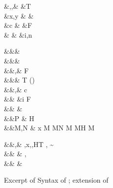 \documentclass[manuscript,screen,nonacm]{acmart}
\begin{document}
 \begin{figure}[ht]
 \begin{syntax}
  &\TyVar,\beta,\Co &\qquad{} &T \\
  &x,y &\qquad{} &\shl{\NType} \\
  &c &\qquad{} &F\\
                      &  &\qquad{} &i,n \in {}\\
 \end{syntax}
 \begin{syntax}
    &&\rho \bnfeq& \\
    &&\kappa \bnfeq& \star \bnfor \kappa \to \kappa \bnfor \shl{\sigma \sim^\kappa_\rho \tau}\\
    &&\tau,\sigma \bnfeq& \TyVar \bnfor {} \bnfor \tau\App\tau \bnfor \Forall {\TyVar\co\kappa} \tau \bnfor F\\
     &&\TypeConst \bnfeq& T \bnfor (\to) \bnfor \shl{\NType}\\
  &&\nu,\Co \bnfeq& c \bnfor {}\tau \bnfor \Sym\Co \bnfor \trans\nu\Co %
 \bnfor \Forall {\TyVar\co\kappa} \Co \bnfor \Co\At\tau %
 \bnfor \nu\App\Co \\
                  &&              &\bnfor \Left \Co \bnfor \Right \Co \bnfor \Nth i \Co \bnfor \TypeConst\App\many\Co \bnfor F\many\Co \bnfor \shl{\SubCo \Co} \\  %
  && \phi \bnfeq& \tau \bnfor \Co\\
  &&P \bnfeq& H\App \many{\TyVar\co\kappa} \\
  &&M,N \bnfeq& x \bnfor {} M \bnfor M\App N \bnfor \TLam{\tau\co\kappa} M \bnfor M\App \tau \bnfor H \bnfor \Case M  \bnfor \Cast \Tm \Co
 \end{syntax}
 \begin{syntax}
  &&\TEnv,\Delta \bnfeq& \empt \bnfor \TEnv,x\co\tau \bnfor \TEnv,\TyVar\co\kappa \bnfor \TEnv,H\co T \bnfor \TEnv, \Co \co \tau\sim\sigma\\
  && \bnfeq& \empt \bnfor {},\alpha\co\rho\\
                     &&\roles{\TypeConst} \bnfeq& \many{\alpha\co\rho}\qquad{}\TypeConst\many\alpha\co\star%
 \end{syntax}
 \caption{Excerpt of Syntax of \SFR; extension of \SFC}
 \label{fig:sfr-syntax}
 \end{figure}
\end{document}
